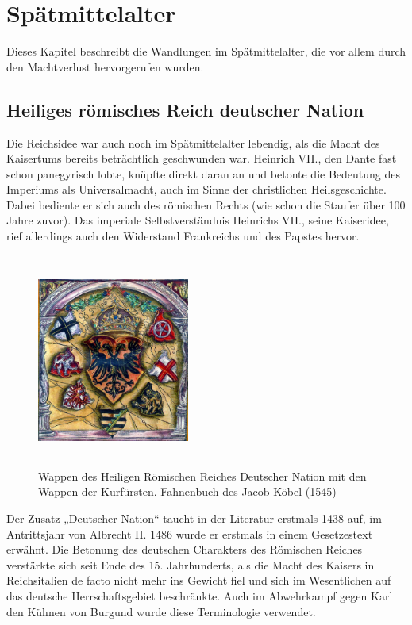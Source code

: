 
\chapter{Spätmittelalter}
\label{chapter-konzept}

Dieses Kapitel beschreibt die Wandlungen im Spätmittelalter, die vor allem durch den Machtverlust hervorgerufen wurden.

\section{Heiliges römisches Reich deutscher Nation}

Die Reichsidee war auch noch im Spätmittelalter lebendig, als die Macht des Kaisertums bereits beträchtlich geschwunden war. Heinrich VII., den Dante fast schon panegyrisch lobte, knüpfte direkt daran an und betonte die Bedeutung des Imperiums als Universalmacht, auch im Sinne der christlichen Heilsgeschichte. Dabei bediente er sich auch des römischen Rechts (wie schon die Staufer über 100 Jahre zuvor). Das imperiale Selbstverständnis Heinrichs VII., seine Kaiseridee, rief allerdings auch den Widerstand Frankreichs und des Papstes hervor.
\begin{figure}[h]
\centering
\includegraphics[width = 5cm, height= 7cm]{Kaiserwappen.jpg}
\caption{Wappen des Heiligen Römischen Reiches Deutscher Nation mit den Wappen der Kurfürsten. Fahnenbuch des Jacob Köbel (1545)}
\end{figure}
Der Zusatz „Deutscher Nation“ taucht in der Literatur erstmals 1438 auf, im Antrittsjahr von Albrecht II. 1486 wurde er erstmals in einem Gesetzestext erwähnt. Die Betonung des deutschen Charakters des Römischen Reiches verstärkte sich seit Ende des 15. Jahrhunderts, als die Macht des Kaisers in Reichsitalien de facto nicht mehr ins Gewicht fiel und sich im Wesentlichen auf das deutsche Herrschaftsgebiet beschränkte. Auch im Abwehrkampf gegen Karl den Kühnen von Burgund wurde diese Terminologie verwendet.


